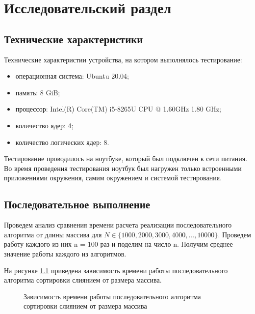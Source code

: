 \chapter{Исследовательский раздел}
\section{Технические характеристики}
Технические характеристии устройства, на котором выполнялось тестирование:
\begin{itemize}
	\item операционная система: Ubuntu 20.04;
	\item память: 8 GiB;
	\item процессор: Intel(R) Core(TM) i5-8265U CPU @ 1.60GHz   1.80 GHz;
	\item количество ядер: 4;
	\item количество логических ядер: 8.
\end{itemize}
Тестирование проводилось на ноутбуке, который был подключен к сети питания. Во время проведения тестирования ноутбук был нагружен только встроенными приложениями окружения, самим окружением и системой тестирования.
\newpage
\section{Последовательное выполнение}
Проведем анализ сравнения времени расчета реализации последовательного алгоритма от длины массива для $N \in \{1000, 2000, 3000, 4000, ..., 10000\}$. Проведем работу каждого из них n = 100 раз и поделим на число n. Получим среднее значение работы каждого из алгоритмов.

На рисунке \ref{fg:6_1} приведена зависимость времени работы последовательного алгоритма сортировки слиянием от размера массива.
\begin{figure}[H]
	\centering
	\caption{Зависимость времени работы последовательного алгоритма сортировки слиянием от размера массива} 
	\label{fg:6_1}
\end{figure}
\newpage

